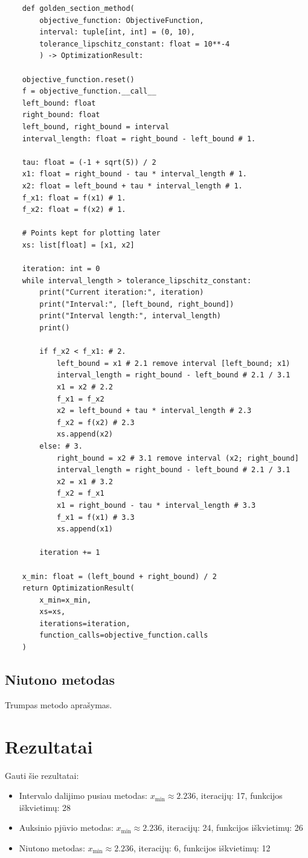 \documentclass[lithuanian,a4paper,12pt]{article}
\begin{document}
\begin{verbatim}
    def golden_section_method(
        objective_function: ObjectiveFunction, 
        interval: tuple[int, int] = (0, 10), 
        tolerance_lipschitz_constant: float = 10**-4
        ) -> OptimizationResult:
    
    objective_function.reset()
    f = objective_function.__call__
    left_bound: float 
    right_bound: float 
    left_bound, right_bound = interval
    interval_length: float = right_bound - left_bound # 1.
    
    tau: float = (-1 + sqrt(5)) / 2
    x1: float = right_bound - tau * interval_length # 1.
    x2: float = left_bound + tau * interval_length # 1.
    f_x1: float = f(x1) # 1.
    f_x2: float = f(x2) # 1.

    # Points kept for plotting later
    xs: list[float] = [x1, x2]
    
    iteration: int = 0
    while interval_length > tolerance_lipschitz_constant:
        print("Current iteration:", iteration)
        print("Interval:", [left_bound, right_bound])
        print("Interval length:", interval_length)
        print()
        
        if f_x2 < f_x1: # 2.
            left_bound = x1 # 2.1 remove interval [left_bound; x1)
            interval_length = right_bound - left_bound # 2.1 / 3.1
            x1 = x2 # 2.2
            f_x1 = f_x2
            x2 = left_bound + tau * interval_length # 2.3
            f_x2 = f(x2) # 2.3
            xs.append(x2)
        else: # 3.
            right_bound = x2 # 3.1 remove interval (x2; right_bound]
            interval_length = right_bound - left_bound # 2.1 / 3.1
            x2 = x1 # 3.2
            f_x2 = f_x1
            x1 = right_bound - tau * interval_length # 3.3
            f_x1 = f(x1) # 3.3
            xs.append(x1)
            
        iteration += 1
        
    x_min: float = (left_bound + right_bound) / 2
    return OptimizationResult(
        x_min=x_min, 
        xs=xs, 
        iterations=iteration, 
        function_calls=objective_function.calls
    )
\end{verbatim}
\pagebreak

\subsection{Niutono metodas}
Trumpas metodo aprašymas.

\section{Rezultatai}
Gauti šie rezultatai:
\begin{itemize}
    \item Intervalo dalijimo pusiau metodas: 
        $x_{\min} \approx 2.236$, iteracijų: 17, funkcijos iškvietimų: 28
    \item Auksinio pjūvio metodas:
        $x_{\min} \approx 2.236$, iteracijų: 24, funkcijos iškvietimų: 26
    \item Niutono metodas:
        $x_{\min} \approx 2.236$, iteracijų: 6, funkcijos iškvietimų: 12
\end{itemize}
\end{document}
